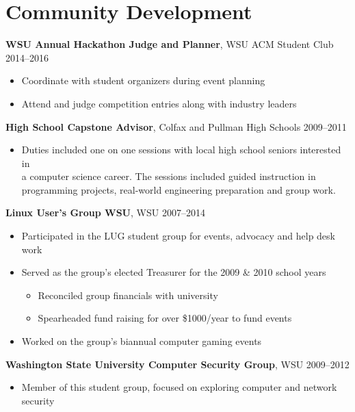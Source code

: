 \AOCLine
\section*{Community Development}
\label{sec:communitydevelopment}

\textbf{WSU Annual Hackathon Judge and Planner}, WSU ACM Student Club \hfill 2014--2016
\begin{itemize}
	\item Coordinate with student organizers during event planning
	\item Attend and judge competition entries along with industry leaders
\end{itemize}

\textbf{High School Capstone Advisor}, Colfax and Pullman High Schools \hfill 2009--2011
\begin{itemize}
	\item Duties included one on one sessions with local high school seniors interested in \\
	\indent a computer science career.  The sessions included guided instruction in \\
	\indent programming projects, real-world engineering preparation and group work.
\end{itemize}

\textbf{Linux User's Group \@ WSU}, WSU \hfill 2007--2014
\begin{itemize}
	\item Participated in the LUG student group for events, advocacy and help desk work
	\item{Served as the group's elected Treasurer for the 2009 \& 2010 school years
		\begin{itemize}
			\item Reconciled group financials with university
			\item Spearheaded fund raising for over \$1000/year to fund events
		\end{itemize}
		}
	\item Worked on the group's biannual computer gaming events
\end{itemize}

\textbf{Washington State University Computer Security Group}, WSU \hfill 2009--2012
\begin{itemize}
	\item Member of this student group, focused on exploring computer and network security
\end{itemize}
